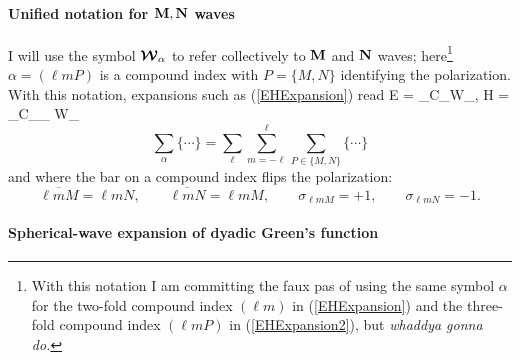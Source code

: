 \documentclass[letterpaper]{article}
\begin{document}
\paragraph{Unified notation for $\mathbf{M}, \mathbf{N}$ waves}

I will use the symbol $\boldsymbol{\mathcal{W}}_\alpha$ to refer
collectively to $\mathbf{M}$ and $\mathbf{N}$ waves;
here\footnote{With this notation I am committing the
faux pas of using the same symbol $\alpha$ for
the two-fold compound index $(\ell m)$ in (\ref{EHExpansion})
and the three-fold compound index $(\ell m P)$ in
(\ref{EHExpansion2}), but \textit{whaddya gonna do.}}
$\alpha=(\ell m P)$ is a compound index
with $P=\{M,N\}$ identifying the polarization.
With this notation, expansions such as (\ref{EHExpansion})
read
{\vb E = \sum_\alpha C_\alpha \bmc W_\alpha, \qquad
   \vb H = 
   \sum_\alpha C_\alpha \sigma_{\alpha} \bmc W_{\overline{\alpha}}
}
$$ \sum_\alpha\{\cdots\} 
   = 
   \sum_{\ell}\sum_{m=-\ell}^\ell \sum_{P\in \{M,N\}} \{\cdots\}
$$
and where the bar on a compound index flips the polarization:
$$
   \overline{\ell m M} = \ell m N, \qquad
   \overline{\ell m N} = \ell m M, \qquad
   \sigma_{\ell m M}=+1, \qquad
   \sigma_{\ell m N}=-1.
$$
\paragraph{Spherical-wave expansion of dyadic Green's function}
\end{document}
